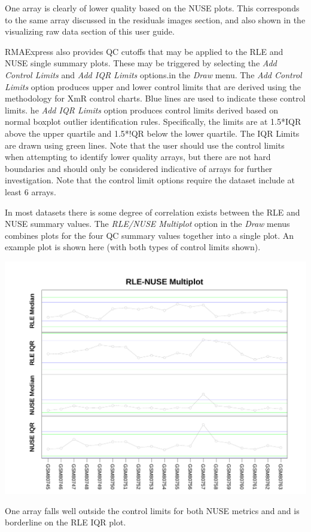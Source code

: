 \documentclass[11pt]{report}
\begin{document}
One array is clearly of lower quality based on the NUSE plots. This corresponds to the same array discussed in the residuals images section, and also shown in the visualizing raw data section of this user guide.

RMAExpress also provides QC cutoffs that may be applied to the RLE and NUSE single summary plots. These may be triggered by selecting the {\it Add Control Limits} and {\it Add IQR Limits} options.in the {\it Draw} menu. The {\it Add Control Limits} option produces upper and lower control limits that are derived using the methodology for XmR control charts. Blue lines are used to indicate these control limits. he {\it Add IQR Limits} option produces control limits derived based on normal boxplot outlier identification rules. Specifically, the limits are at 1.5*IQR above the upper quartile and 1.5*!QR below the lower quartile. The IQR Limits are drawn using green lines. Note that the user should use the control limits when attempting to identify lower quality arrays, but there are not hard boundaries and should only be considered indicative of arrays for further investigation. Note that the control limit options require the dataset include at least 6 arrays.

In most datasets there is some degree of correlation exists between the RLE and NUSE summary values. The {\it RLE/NUSE Multiplot} option in the {\it Draw} menus combines plots for the four QC summary values together into a single plot. An example plot is shown here (with both types of control limits shown).
\begin{center}
\includegraphics[scale=0.4]{RLENUSEMultiplot_New.pdf}
\end{center}
One array falls well outside the control limits for both NUSE metrics and and is borderline on the RLE IQR plot.
\end{document}
